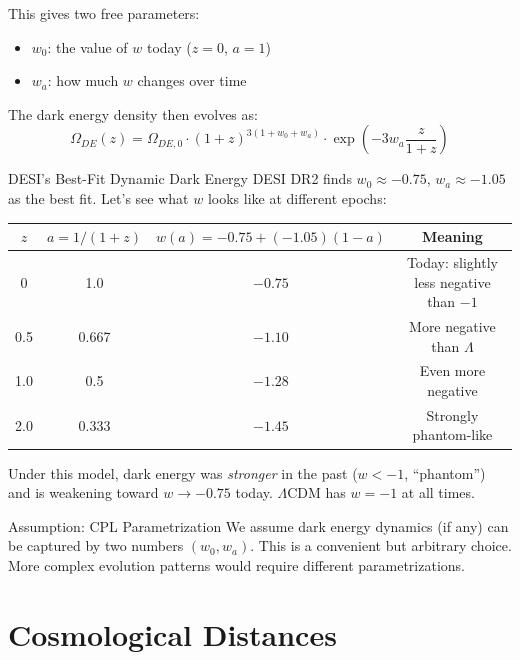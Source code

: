 \documentclass[11pt,a4paper]{article}
\newcommand{\LCDM}{$\Lambda$CDM}
\begin{document}
This gives two free parameters:
\begin{itemize}
    \item $w_0$: the value of $w$ today ($z = 0$, $a = 1$)
    \item $w_a$: how much $w$ changes over time
\end{itemize}

The dark energy density then evolves as:
\begin{equation}
\Omega_{DE}(z) = \Omega_{DE,0} \cdot (1+z)^{3(1+w_0+w_a)} \cdot \exp\!\left(-3 w_a \frac{z}{1+z}\right)
\label{eq:de_evolution}
\end{equation}

\begin{examplebox}{DESI's Best-Fit Dynamic Dark Energy}
DESI DR2 finds $w_0 \approx -0.75$, $w_a \approx -1.05$ as the best fit. Let's see what $w$ looks like at different epochs:

\begin{center}
\begin{tabular}{cccc}
\toprule
$z$ & $a = 1/(1+z)$ & $w(a) = -0.75 + (-1.05)(1-a)$ & Meaning \\
\midrule
0 & 1.0 & $-0.75$ & Today: slightly less negative than $-1$ \\
0.5 & 0.667 & $-1.10$ & More negative than $\Lambda$ \\
1.0 & 0.5 & $-1.28$ & Even more negative \\
2.0 & 0.333 & $-1.45$ & Strongly phantom-like \\
\bottomrule
\end{tabular}
\end{center}
Under this model, dark energy was \textit{stronger} in the past ($w < -1$, ``phantom'') and is weakening toward $w \to -0.75$ today. \LCDM{} has $w = -1$ at all times.
\end{examplebox}

\begin{warningbox}{Assumption: CPL Parametrization}
We assume dark energy dynamics (if any) can be captured by two numbers $(w_0, w_a)$. This is a convenient but arbitrary choice. More complex evolution patterns would require different parametrizations.
\end{warningbox}


\section{Cosmological Distances}
\label{sec:distances}
\end{document}
